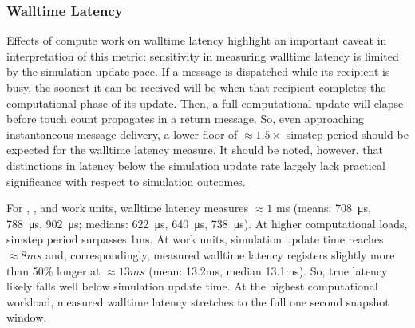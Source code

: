 
\subsubsection{Walltime Latency}

Effects of compute work on walltime latency highlight an important caveat in interpretation of this metric: sensitivity in measuring walltime latency is limited by the simulation update pace.
If a message is dispatched while its recipient is busy, the soonest it can be received will be when that recipient completes the computational phase of its update.
Then, a full computational update will elapse before touch count propagates in a return message.
So, even approaching instantaneous message delivery, a lower floor of $\approx 1.5 \times$ simstep period should be expected for the walltime latency measure.
It should be noted, however, that distinctions in latency below the simulation update rate largely lack practical significance with respect to simulation outcomes.

For , , and  work units, walltime latency measures $\approx 1$ ms (means: \SI{708}{\micro\second}, \SI{788}{\micro\second}, \SI{902}{\micro\second}; medians: \SI{622}{\micro\second}, \SI{640}{\micro\second}, \SI{738}{\micro\second}).
At higher computational loads, simstep period surpasses 1ms.
At  work units, simulation update time reaches $\approx 8ms$ and, correspondingly, measured walltime latency registers slightly more than 50\% longer at $\approx 13ms$ (mean: 13.2ms, median 13.1ms).
So, true latency likely falls well below simulation update time.
At the highest computational workload, measured walltime latency stretches to the full one second snapshot window.

